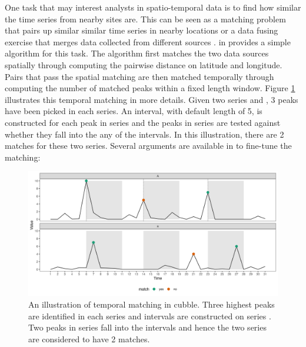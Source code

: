 \documentclass[
]{jss}
\begin{document}
One task that may interest analysts in spatio-temporal data is to find
how similar the time series from nearby sites are. This can be seen as a
matching problem \citep{stuart2010matching, mcintosh2018using} that
pairs up similar similar time series in nearby locations or a data
fusing exercise that merges data collected from different sources
\citep{cocchi2019data}.  in  provides a
simple algorithm for this task. The algorithm first matches the two data
sources spatially through computing the pairwise distance on latitude
and longitude. Pairs that pass the spatial matching are then matched
temporally through computing the number of matched peaks within a fixed
length window. Figure \ref{fig:illu-matching} illustrates this temporal
matching in more details. Given two series  and , 3
peaks have been picked in each series. An interval, with default length
of 5, is constructed for each peak in series  and the peaks in
series  are tested against whether they fall into the any of the
intervals. In this illustration, there are 2 matches for these two
series. Several arguments are available in  to
fine-tune the matching:

\begin{CodeChunk}
\begin{figure}

{\centering \includegraphics[width=1\linewidth]{figures/illu-matching} 

}

\caption{An illustration of temporal matching in cubble. Three highest peaks are identified in each series and intervals are constructed on series . Two peaks in series  fall into the intervals and hence the two series are considered to have 2 matches.}\label{fig:illu-matching}
\end{figure}
\end{CodeChunk}
\end{document}

